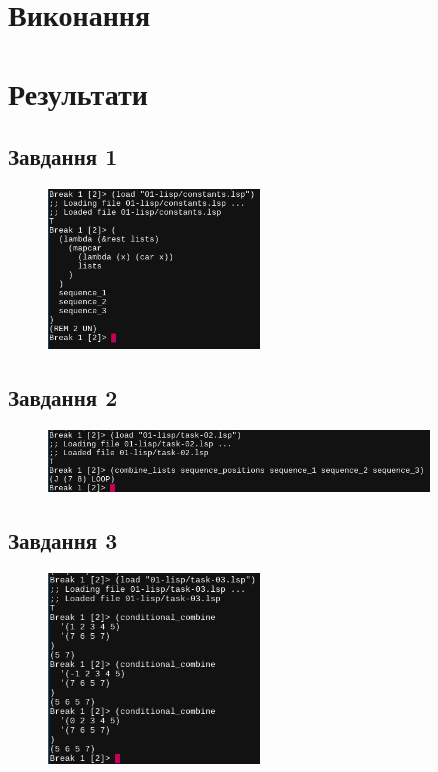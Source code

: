 \documentclass[a4paper, 10pt]{extarticle}
\begin{document}
\section{Виконання}






\section{Результати}
\subsection{Завдання 1}
\begin{figure}[h!]
  \centering
  \includegraphics[width=0.5\textwidth]{screenshots/task-01.png}
\end{figure}
\subsection{Завдання 2}
\begin{figure}[h!]
  \centering
  \includegraphics[width=0.9\textwidth]{screenshots/task-02.png}
\end{figure}
\subsection{Завдання 3}
\begin{figure}[h!]
  \centering
  \includegraphics[width=0.5\textwidth]{screenshots/task-03.png}
\end{figure}
\end{document}
